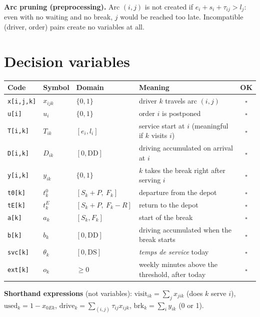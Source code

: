 \documentclass[11pt,a4paper]{article}
\newcommand{\ok}{$\square$}
\newcommand{\DD}{\mathrm{DD}}\newcommand{\DS}{\mathrm{DS}}\newcommand{\WD}{\mathrm{WD}}
\newcommand{\visit}{\mathrm{visit}}\newcommand{\used}{\mathrm{used}}
\newcommand{\drive}{\mathrm{drive}}\newcommand{\brk}{\mathrm{brk}}
\begin{document}
\textbf{Arc pruning (preprocessing).} Arc $(i,j)$ is not created if $e_i + s_i + \tau_{ij} > l_j$: even with no waiting and no break, $j$ would be reached too late. Incompatible (driver, order) pairs create no variables at all.

\section{Decision variables}

\begin{center}\small
\begin{tabularx}{\textwidth}{@{}l l l X c@{}}
\toprule
\textbf{Code} & \textbf{Symbol} & \textbf{Domain} & \textbf{Meaning} & \textbf{OK}\\
\midrule
\texttt{x[i,j,k]} & $x_{ijk}$ & $\{0,1\}$ & driver $k$ travels arc $(i,j)$ & \ok\\
\texttt{u[i]} & $u_i$ & $\{0,1\}$ & order $i$ is postponed & \ok\\
\texttt{T[i,k]} & $T_{ik}$ & $[e_i, l_i]$ & service start at $i$ (meaningful if $k$ visits $i$) & \ok\\
\texttt{D[i,k]} & $D_{ik}$ & $[0, \DD]$ & driving accumulated on arrival at $i$ & \ok\\
\texttt{y[i,k]} & $y_{ik}$ & $\{0,1\}$ & $k$ takes the break right after serving $i$ & \ok\\
\texttt{t0[k]} & $t^0_k$ & $[S_k+P,\ F_k]$ & departure from the depot & \ok\\
\texttt{tE[k]} & $t^E_k$ & $[S_k+P,\ F_k-R]$ & return to the depot & \ok\\
\texttt{a[k]} & $a_k$ & $[S_k, F_k]$ & start of the break & \ok\\
\texttt{b[k]} & $b_k$ & $[0, \DD]$ & driving accumulated when the break starts & \ok\\
\texttt{svc[k]} & $\theta_k$ & $[0, \DS]$ & \emph{temps de service} today & \ok\\
\texttt{ext[k]} & $o_k$ & $\ge 0$ & weekly minutes above the threshold, after today & \ok\\
\bottomrule
\end{tabularx}
\end{center}

\textbf{Shorthand expressions} (not variables):
$\visit_{ik} = \sum_{j} x_{jik}$ \;(does $k$ serve $i$),\quad
$\used_k = 1 - x_{0Ek}$,\quad
$\drive_k = \sum_{(i,j)} \tau_{ij} x_{ijk}$,\quad
$\brk_k = \sum_i y_{ik}$ \;(0 or 1).
\end{document}

